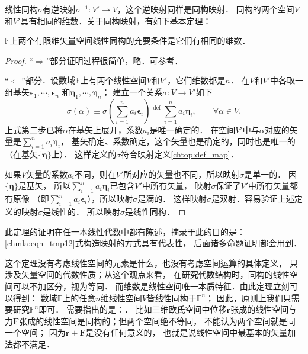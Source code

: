 线性同构$\sigma$有逆映射$\sigma^{-1}:V'\to V$，这个逆映射同样是同构映射．
同构的两个空间$V$和$V'$具有相同的维数．关于同构映射，有如下基本定理：
\begin{theorem}\label{chmla:thm_vvp-basic}
    $\mathbb{F}$上两个有限维矢量空间线性同构的充要条件是它们有相同的维数．
\end{theorem}
\begin{proof}
    “$\Rightarrow$”部分证明过程很简单，略．可参考\parencite[\S 8.3]{qiuws-2019-v2}．

    “$\Leftarrow$”部分．设数域$\mathbb{F}$上有两个线性空间$V$和$V'$，它们维数都是$n$．
    在$V$和$V'$中各取一组基矢$\boldsymbol{\epsilon}_1,\cdots,\boldsymbol{\epsilon}_n$
    和$\boldsymbol{\eta}_1,\cdots,\boldsymbol{\eta}_n$；
    建立一个关系$\sigma : V \to V'$如下
    \begin{equation}\label{chmla:eqn_tmp12}
        \sigma (\alpha) \equiv
        \sigma \left(\sum_{i=1}^{n} a_i \boldsymbol{\epsilon}_i \right)
        \overset{\mathrm {def}}{=}
        \sum_{i=1}^{n} a_i \boldsymbol{\eta}_i,
        \qquad \forall \alpha \in V.
    \end{equation}
    上式第二步已将$\alpha$在基矢上展开，系数$a_i$是唯一确定的．
    在空间$V'$中与$\alpha$对应的矢量是$\sum_{i=1}^{n} a_i \boldsymbol{\eta}_i$，
    基矢确定、系数确定，这个矢量也是确定的，同时也是唯一的（在基矢$\{\boldsymbol{\eta}\}$上）．
    这样定义的$\sigma$符合映射定义\ref{chtop:def_map}．

    如果$V$矢量的系数$a_i$不同，则在$V'$所对应的矢量也不同，所以映射$\sigma$是单一的．
    因$\{\boldsymbol{\eta}\}$是基矢，
    所以$\sum_{i=1}^{n} a_i \boldsymbol{\eta}_i$已包含$V'$中所有矢量，
    映射$\sigma$保证了$V'$中所有矢量都有原像
    （即$\sum_{i=1}^{n} a_i \boldsymbol{\epsilon}_i$），所以映射$\sigma$是满的．
    这样映射$\sigma$是双射．容易验证上述定义的映射$\sigma$是线性的．
    所以映射$\sigma$是线性同构．
\end{proof}
此定理的证明在任一本线性代数中都有陈述，摘录于此的目的是：
\eqref{chmla:eqn_tmp12}式构造映射的方式具有代表性，
后面诸多命题证明都会用到．

这个定理没有考虑线性空间的元素是什么，也没有考虑空间运算的具体定义，
只涉及矢量空间的代数性质；从这个观点来看，
在研究代数结构时，同构的线性空间可以不加区分，视为等同．
而维数是线性空间唯一本质特征．由此定理立刻可以得到：
数域$\mathbb{F}$上的任意$n$维线性空间$V$皆线性同构于$\mathbb{F}^n$；
因此，原则上我们只需要研究$\mathbb{F}^n$即可．
需要指出的是：．
比如三维欧氏空间中位移$\boldsymbol{r}$张成的线性空间与
力$\boldsymbol{F}$张成的线性空间是同构的；但两个空间绝不等同，
不能认为两个空间就是同一个空间；
因为$\boldsymbol{r}+\boldsymbol{F}$是没有任何意义的，
也就是说线性空间中最基本的矢量加法都不满足．

